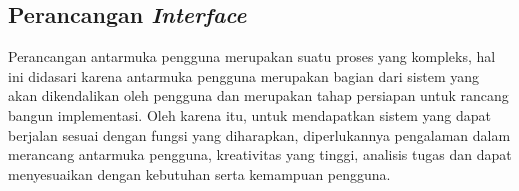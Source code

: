 \subsection{Perancangan\textit{ Interface}}
\par Perancangan antarmuka pengguna merupakan suatu proses yang kompleks, hal ini didasari karena antarmuka pengguna merupakan bagian dari sistem yang akan dikendalikan oleh pengguna dan merupakan tahap persiapan untuk rancang bangun implementasi. Oleh karena itu, untuk mendapatkan sistem yang dapat berjalan sesuai dengan fungsi yang diharapkan, diperlukannya pengalaman dalam merancang antarmuka pengguna, kreativitas yang tinggi, analisis tugas dan dapat menyesuaikan dengan kebutuhan serta kemampuan pengguna.

